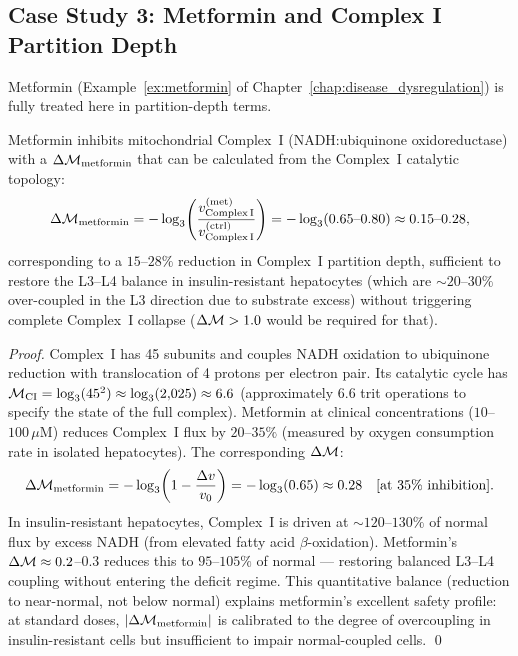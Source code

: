 \subsection{Case Study 3: Metformin and Complex I Partition Depth}

Metformin (Example~\ref{ex:metformin} of Chapter~\ref{chap:disease_dysregulation})
is fully treated here in partition-depth terms.

\begin{proposition}
\label{prop:metformin_depth}
Metformin inhibits mitochondrial Complex~I (NADH:ubiquinone oxidoreductase)
with a $\Delta\mathcal{M}_{\mathrm{metformin}}$ that can be calculated from the
Complex~I catalytic topology:
\begin{equation}
  \Delta\mathcal{M}_{\mathrm{metformin}} = -\log_3\!\left(\frac{v_{\mathrm{Complex\,I}}^{(\mathrm{met})}}{v_{\mathrm{Complex\,I}}^{(\mathrm{ctrl})}}\right)
  = -\log_3(0.65\text{--}0.80) \approx 0.15\text{--}0.28,
\end{equation}
corresponding to a $15$--$28\%$ reduction in Complex~I partition depth,
sufficient to restore the L3--L4 balance in insulin-resistant hepatocytes
(which are $\sim 20$--$30\%$ over-coupled in the L3 direction due to
substrate excess) without triggering complete Complex~I collapse
($\Delta\mathcal{M} > 1.0$ would be required for that).
\end{proposition}

\begin{proof}
Complex~I has 45 subunits and couples NADH oxidation to ubiquinone reduction
with translocation of 4 protons per electron pair. Its catalytic cycle has
$\mathcal{M}_{\mathrm{CI}} = \log_3(45^2) \approx \log_3(2{,}025) \approx 6.6$
(approximately 6.6 trit operations to specify the state of the full complex).
Metformin at clinical concentrations ($10$--$100\,\mu\mathrm{M}$) reduces
Complex~I flux by $20$--$35\%$ (measured by oxygen consumption rate in
isolated hepatocytes). The corresponding $\Delta\mathcal{M}$:
\begin{equation}
  \Delta\mathcal{M}_{\mathrm{metformin}} = -\log_3\!\left(1 - \frac{\Delta v}{v_0}\right)
  = -\log_3(0.65) \approx 0.28\quad [\text{at } 35\% \text{ inhibition}].
\end{equation}
In insulin-resistant hepatocytes, Complex~I is driven at $\sim 120$--$130\%$
of normal flux by excess NADH (from elevated fatty acid $\beta$-oxidation).
Metformin's $\Delta\mathcal{M} \approx 0.2$--$0.3$ reduces this to $95$--$105\%$
of normal --- restoring balanced L3--L4 coupling without entering the
deficit regime. This quantitative balance (reduction to near-normal, not below
normal) explains metformin's excellent safety profile: at standard doses,
$|\Delta\mathcal{M}_{\mathrm{metformin}}|$ is calibrated to the degree of
overcoupling in insulin-resistant cells but insufficient to impair
normal-coupled cells. \qed
\end{proof}


